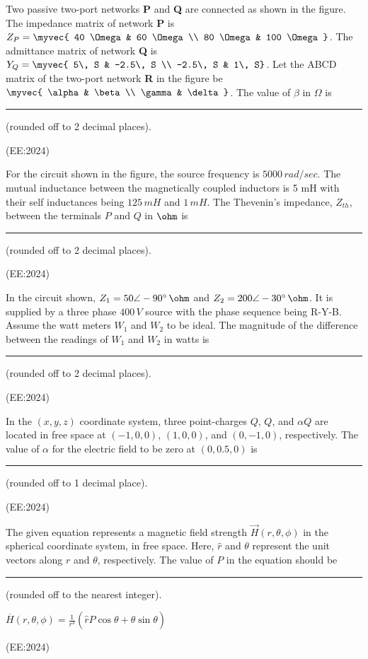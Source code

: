     \item Two passive two-port networks \textbf{P} and \textbf{Q} are connected as shown in the figure. The impedance matrix of network \textbf{P} is $Z_P = \myvec{ 40 \Omega & 60 \Omega \\ 80 \Omega & 100 \Omega }$. The admittance matrix of network \textbf{Q} is $Y_Q = \myvec{ 5\, S & -2.5\, S \\ -2.5\, S & 1\, S}$. Let the ABCD matrix of the two-port network \textbf{R} in the figure be $\myvec{ \alpha & \beta \\ \gamma & \delta }$. The value of $\beta$ in $\Omega$ is \rule{2.5cm}{0.4pt} (rounded off to 2 decimal places).
	    

		    \hfill{(EE:2024)}

    \item For the circuit shown in the figure, the source frequency is $5000 \, rad/sec$. The mutual inductance between the magnetically coupled inductors is 5 mH with their self inductances being $125\, mH$ and $1\, mH$. The Thevenin's impedance, $Z_{th}$, between the terminals $P$ and $Q$ in $\ohm$ is  \rule{2cm}{0.4pt} (rounded off to 2 decimal places). 
	    

	    \hfill{(EE:2024)}

    \item In the circuit shown, $Z_1 = 50\angle -90^\circ \, \ohm$ and $Z_2 = 200\angle -30^\circ \, \ohm$. It is supplied by a three phase $400\, V$ source with the phase sequence being R-Y-B. Assume the watt meters $W_1$ and $W_2$ to be ideal. The magnitude of the difference between the readings of $W_1$ and $W_2$ in watts is \rule{2.5cm}{0.4pt} (rounded off to 2 decimal places).
	    

	    \hfill{(EE:2024)}

    \item In the $(x, y, z)$ coordinate system, three point-charges $Q$, $Q$, and $\alpha Q$ are located in free space at $(-1, 0, 0)$, $(1, 0, 0)$, and $(0, -1, 0)$, respectively. The value of $\alpha$ for the electric field to be zero at $(0, 0.5, 0)$ is \rule{2.5cm}{0.4pt} (rounded off to 1 decimal place). 

	    \hfill{(EE:2024)}

    \item The given equation represents a magnetic field strength $\vec{H}(r, \theta, \phi)$ in the spherical coordinate system, in free space. Here, $\hat{r}$ and $\theta$ represent the unit vectors along $r$ and $\theta$, respectively. The value of $P$ in the equation should be  \rule{2.5cm}{0.4pt} (rounded off to the nearest integer).\\
	    \begin{center}
$\overline{H}(r, \theta, \phi) = \frac{1}{r^3} \left( \hat{r} P \cos \theta + \hat{\theta} \sin \theta \right)$
	    \end{center}

	    \hfill{(EE:2024)}

